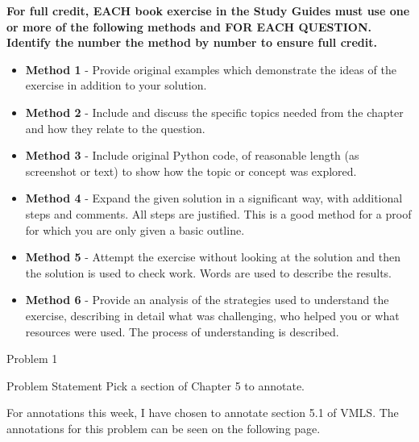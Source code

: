 \textbf{For full credit,  EACH book exercise in the Study Guides must use one or more of the following methods and FOR EACH QUESTION.  Identify the number the method by number to ensure full credit.}

\begin{itemize}
    \item \textbf{Method 1} - Provide original examples which demonstrate the ideas of the exercise in addition to your solution.
    \item \textbf{Method 2} - Include and discuss the specific topics needed from the chapter and how they relate to the question.
    \item \textbf{Method 3} - Include original Python code, of reasonable length (as screenshot or text)  to show how the topic or concept was explored.
    \item \textbf{Method 4} - Expand the given solution in a significant way, with additional steps and comments. All steps are justified. This is a good method for a proof for which you are only given a basic outline.
    \item \textbf{Method 5} - Attempt the exercise without looking at the solution and then the solution is used to check work. Words are used to describe the results.
    \item \textbf{Method 6} - Provide an analysis of the strategies used to understand the exercise, describing in detail what was challenging, who helped you or what resources were used. The process of understanding is
    described.
\end{itemize}

\begin{problem}{Problem 1}
    \begin{statement}{Problem Statement}
        Pick a section of Chapter 5 to annotate.
    \end{statement}

    For annotations this week, I have chosen to annotate section 5.1 of VMLS. The annotations for this problem can be seen on the following page.

    
\end{problem}

